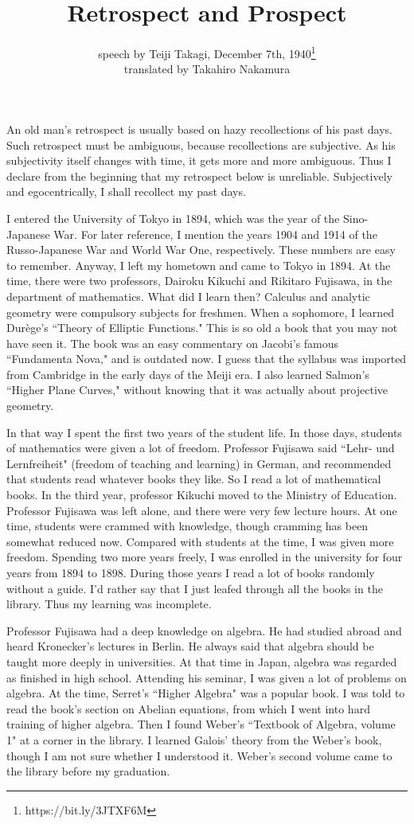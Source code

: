 \documentclass[11pt,a4j,twocolumn]{jarticle}
\title{Retrospect and Prospect}
\author{speech by Teiji Takagi, December 7th, 1940\thanks{https://bit.ly/3JTXF6M}\\
translated by Takahiro Nakamura
}
\date{}
\begin{document}
\maketitle

\noindent
An old man's retrospect is usually based on hazy recollections of his past days.
Such retrospect must be ambiguous, because recollections are subjective.
As his subjectivity itself changes with time,
it gets more and more ambiguous.
Thus I declare from the beginning that my retrospect below is unreliable.
Subjectively and egocentrically, I shall recollect my past days.

I entered the University of Tokyo in 1894, which was the year of the Sino-Japanese War.
For later reference, I mention the years 1904 and 1914 of
the Russo-Japanese War and World War One, respectively.
These numbers are easy to remember.
Anyway, I left my hometown and came to Tokyo in 1894.
At the time, there were two professors,
Dairoku Kikuchi and Rikitaro Fujisawa, in the department of mathematics.
What did I learn then?
Calculus and analytic geometry were compulsory subjects for freshmen.
When a sophomore, I learned Dur\`ege's ``Theory of Elliptic Functions."
This is so old a book that you may not have seen it.
The book was an easy commentary on Jacobi's famous ``Fundamenta Nova,"
and is outdated now.
I guess that the syllabus was imported from Cambridge 
in the early days of the Meiji era.
I also learned Salmon's ``Higher Plane Curves,"
without knowing that it was actually about projective geometry.

In that way I spent the first two years of the student life.
In those days, students of mathematics were given a lot of freedom.
Professor Fujisawa said ``Lehr- und Lernfreiheit" (freedom of teaching and learning) in German,
and recommended that students read whatever books they like.
So I read a lot of mathematical books.
In the third year, professor Kikuchi moved to the Ministry of Education.
Professor Fujisawa was left alone, and there were very few lecture hours.
At one time, students were crammed with knowledge,
though cramming has been somewhat reduced now.
Compared with students at the time, I was given more freedom.
Spending two more years freely, I was enrolled in the university for four years from 1894 to 1898.
During those years I read a lot of books randomly without a guide.
I'd rather say that I just leafed through all the books in the library.
Thus my learning was incomplete.

Professor Fujisawa had a deep knowledge on algebra.
He had studied abroad and heard Kronecker's lectures in Berlin.
He always said that algebra should be taught more deeply in universities.
At that time in Japan, algebra was regarded as finished in high school.
Attending his seminar, I was given a lot of problems on algebra.
At the time, Serret's ``Higher Algebra" was a popular book.
I was told to read the book's section on Abelian equations,
from which I went into hard training of higher algebra.
Then I found Weber's ``Textbook of Algebra, volume 1" at a corner in the library.
I learned Galois' theory from the Weber's book, though I am not sure whether I understood it.
Weber's second volume came to the library before my graduation.
\end{document}
